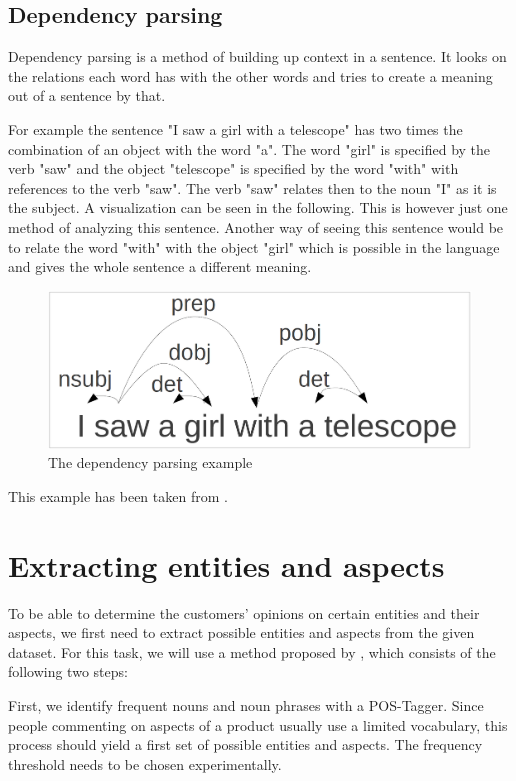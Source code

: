 \documentclass[10pt,a4paper]{article}
\begin{document}
		\subsection{Dependency parsing}
		
		Dependency parsing is a method of building up context in a sentence.
		It looks on the relations each word has with the other words and tries to create a meaning out of a sentence by that.
		
		For example the sentence "I saw a girl with a telescope" has two times the combination of an object with the word "a". 
		The word "girl" is specified by the verb "saw" and the object "telescope" is specified by the word "with" with references to the verb "saw". 
		The verb "saw" relates then to the noun "I" as it is the subject. 		
		A visualization can be seen in the following.
		This is however just one method of analyzing this sentence.
		Another way of seeing this sentence would be to relate the word "with" with the object "girl" which is possible in the language and gives the whole sentence a different meaning.
		
		\begin{figure}[h]
			\centering
			\includegraphics[width=0.8\linewidth]{data/dependency}
			\caption{The dependency parsing example}
			\label{fig:dependency}
		\end{figure}
		
		This example has been taken from \cite{dependency}.
	
	\section{Extracting entities and aspects}
	To be able to determine the customers' opinions on certain entities and their aspects, we first need to extract possible entities and aspects from the given dataset. For this task, we will use a method proposed by \cite{Hu:2004:MSC:1014052.1014073}, which consists of the following two steps:
	
	First, we identify frequent nouns and noun phrases with a POS-Tagger. Since people commenting on aspects of a product usually use a limited vocabulary, this process should yield a first set of possible entities and aspects. The frequency threshold needs to be chosen experimentally.
	
\end{document}
